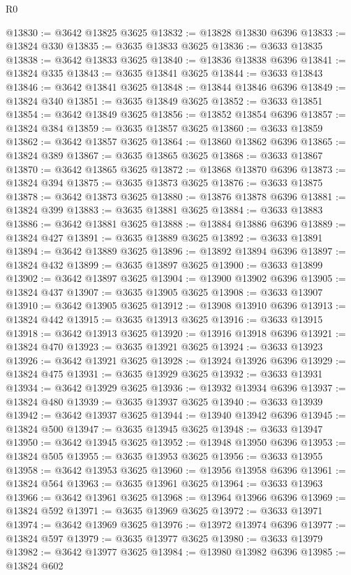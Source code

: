 \begin{lexlean}{R0}
\begin{coremodule}
@13830 := @3642 @13825 @3625
@13832 := @13828 @13830 @6396
@13833 := @13824 @330
@13835 := @3635 @13833 @3625
@13836 := @3633 @13835
@13838 := @3642 @13833 @3625
@13840 := @13836 @13838 @6396
@13841 := @13824 @335
@13843 := @3635 @13841 @3625
@13844 := @3633 @13843
@13846 := @3642 @13841 @3625
@13848 := @13844 @13846 @6396
@13849 := @13824 @340
@13851 := @3635 @13849 @3625
@13852 := @3633 @13851
@13854 := @3642 @13849 @3625
@13856 := @13852 @13854 @6396
@13857 := @13824 @384
@13859 := @3635 @13857 @3625
@13860 := @3633 @13859
@13862 := @3642 @13857 @3625
@13864 := @13860 @13862 @6396
@13865 := @13824 @389
@13867 := @3635 @13865 @3625
@13868 := @3633 @13867
@13870 := @3642 @13865 @3625
@13872 := @13868 @13870 @6396
@13873 := @13824 @394
@13875 := @3635 @13873 @3625
@13876 := @3633 @13875
@13878 := @3642 @13873 @3625
@13880 := @13876 @13878 @6396
@13881 := @13824 @399
@13883 := @3635 @13881 @3625
@13884 := @3633 @13883
@13886 := @3642 @13881 @3625
@13888 := @13884 @13886 @6396
@13889 := @13824 @427
@13891 := @3635 @13889 @3625
@13892 := @3633 @13891
@13894 := @3642 @13889 @3625
@13896 := @13892 @13894 @6396
@13897 := @13824 @432
@13899 := @3635 @13897 @3625
@13900 := @3633 @13899
@13902 := @3642 @13897 @3625
@13904 := @13900 @13902 @6396
@13905 := @13824 @437
@13907 := @3635 @13905 @3625
@13908 := @3633 @13907
@13910 := @3642 @13905 @3625
@13912 := @13908 @13910 @6396
@13913 := @13824 @442
@13915 := @3635 @13913 @3625
@13916 := @3633 @13915
@13918 := @3642 @13913 @3625
@13920 := @13916 @13918 @6396
@13921 := @13824 @470
@13923 := @3635 @13921 @3625
@13924 := @3633 @13923
@13926 := @3642 @13921 @3625
@13928 := @13924 @13926 @6396
@13929 := @13824 @475
@13931 := @3635 @13929 @3625
@13932 := @3633 @13931
@13934 := @3642 @13929 @3625
@13936 := @13932 @13934 @6396
@13937 := @13824 @480
@13939 := @3635 @13937 @3625
@13940 := @3633 @13939
@13942 := @3642 @13937 @3625
@13944 := @13940 @13942 @6396
@13945 := @13824 @500
@13947 := @3635 @13945 @3625
@13948 := @3633 @13947
@13950 := @3642 @13945 @3625
@13952 := @13948 @13950 @6396
@13953 := @13824 @505
@13955 := @3635 @13953 @3625
@13956 := @3633 @13955
@13958 := @3642 @13953 @3625
@13960 := @13956 @13958 @6396
@13961 := @13824 @564
@13963 := @3635 @13961 @3625
@13964 := @3633 @13963
@13966 := @3642 @13961 @3625
@13968 := @13964 @13966 @6396
@13969 := @13824 @592
@13971 := @3635 @13969 @3625
@13972 := @3633 @13971
@13974 := @3642 @13969 @3625
@13976 := @13972 @13974 @6396
@13977 := @13824 @597
@13979 := @3635 @13977 @3625
@13980 := @3633 @13979
@13982 := @3642 @13977 @3625
@13984 := @13980 @13982 @6396
@13985 := @13824 @602

\end{coremodule}
\end{lexlean}
